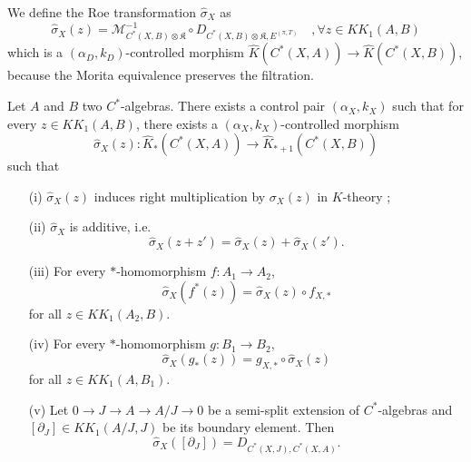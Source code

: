 \begin{definition}
We define the Roe transformation $\hat\sigma_X$ as 
\[\hat\sigma_X(z)= \mathcal M_{C^*(X,B)\otimes \mathfrak K}^{-1} \circ D_{C^*(X,B)\otimes \mathfrak K,E^{(\pi,T)}}
\quad, \forall z\in KK_1(A,B)\]
which is a $(\alpha_D,k_D)$-controlled morphism $\hat K(C^*(X,A))\rightarrow \hat K(C^*(X,B))$, because the Morita equivalence preserves the filtration.
\end{definition}

\begin{prop}\label{Roe1}
Let $A$ and $B$ two $C^*$-algebras. There exists a control pair $(\alpha_X,k_X)$ such that for every $z\in KK_1(A,B)$, there exists a $(\alpha_X,k_X)$-controlled morphism
\[\hat\sigma_{X}(z) : \hat K_*(C^*(X,A))\rightarrow \hat K_{*+1}(C^*(X,B))\]
such that
\begin{enumerate}
\item[(i)] $\hat\sigma_X(z)$ induces right multiplication by $\sigma_{X}(z)$ in $K$-theory ;
\item[(ii)] $\hat\sigma_X$ is additive, i.e.
\[\hat\sigma_X(z+z')=\hat\sigma_X(z)+\hat\sigma_X(z').\]
\item[(iii)] For every $*$-homomorphism $f : A_1\rightarrow A_2$,
\[\hat\sigma_X(f^*(z))=\hat\sigma_X(z)\circ f_{X,*}\] for all $z\in KK_1(A_2,B)$.
\item[(iv)] For every $*$-homomorphism $g : B_1\rightarrow B_2$,
\[\hat\sigma_X(g_*(z))= g_{X,*}\circ \hat\sigma_X(z)\] for all $z\in KK_1(A,B_1)$.
\item[(v)] Let $0\rightarrow J\rightarrow A\rightarrow A/J\rightarrow 0$ be a semi-split extension of $C^*$-algebras and $[\partial_J]\in KK_1(A/J,J)$ be its boundary element. Then 
\[\hat\sigma_X([\partial_J])=D_{C^*(X,J),C^*(X,A)}.\] 
\end{enumerate}
\end{prop}

